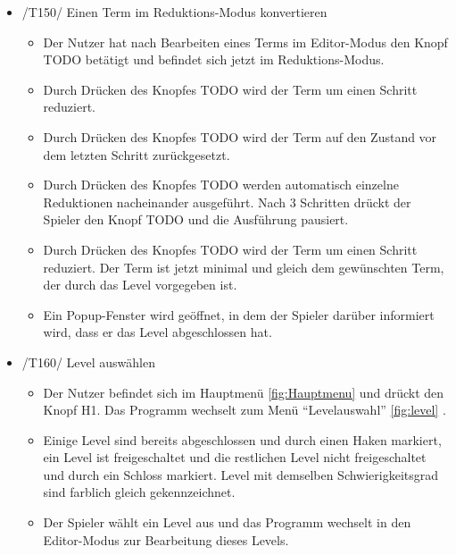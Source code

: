 \begin{itemize}
\item /T150/ Einen Term im Reduktions-Modus konvertieren
\begin{itemize}
\item Der Nutzer hat nach Bearbeiten eines Terms im Editor-Modus den Knopf TODO betätigt und befindet sich jetzt im Reduktions-Modus.
\item Durch Drücken des Knopfes TODO wird der Term um einen Schritt reduziert.
\item Durch Drücken des Knopfes TODO wird der Term auf den Zustand vor dem letzten Schritt zurückgesetzt.
\item Durch Drücken des Knopfes TODO werden automatisch einzelne Reduktionen nacheinander ausgeführt. Nach 3 Schritten drückt der Spieler den Knopf TODO und die Ausführung pausiert.
\item Durch Drücken des Knopfes TODO wird der Term um einen Schritt reduziert. Der Term ist jetzt minimal und gleich dem gewünschten Term, der durch das Level vorgegeben ist.
\item Ein Popup-Fenster wird geöffnet, in dem der Spieler darüber informiert wird, dass er das Level abgeschlossen hat.
\end{itemize}

\item /T160/ Level auswählen
\begin{itemize}
\item Der Nutzer befindet sich im Hauptmenü \ref{fig:Hauptmenu} und drückt den Knopf H1. Das Programm wechselt zum Menü "`Levelauswahl"'  \ref{fig:level} .
\item Einige Level sind bereits abgeschlossen und durch einen Haken markiert, ein Level ist freigeschaltet und die restlichen Level nicht freigeschaltet und durch ein Schloss markiert. Level mit demselben Schwierigkeitsgrad sind farblich gleich gekennzeichnet.
\item Der Spieler wählt ein Level aus und das Programm wechselt in den Editor-Modus zur Bearbeitung dieses Levels.
\end{itemize}


\end{itemize}
